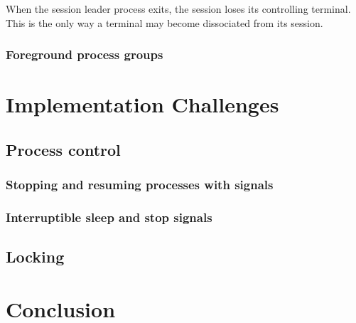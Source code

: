 \documentclass[shortabstract, manyadvisors, english, mgr]{iithesis}
\begin{document}
When the session leader process exits, the session loses its controlling
terminal. This is the only way a terminal may become dissociated from its
session.

\subsection{Foreground process groups}
\chapter{Implementation Challenges}
\section{Process control}
\subsection{Stopping and resuming processes with signals}
\subsection{Interruptible sleep and stop signals}
\section{Locking}
\chapter{Conclusion}



\end{document}
